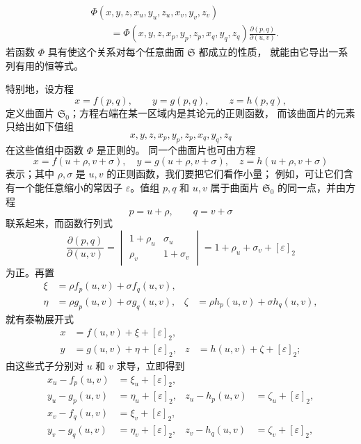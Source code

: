 \documentclass[11pt,a4paper,leqno]{article}
\begin{document}
\begin{equation}\tag{1}
\begin{aligned}
&\Phi(x,y,z,x_u,y_u,z_u,x_v,y_v,z_v)\\
&\qquad=
\Phi(x,y,z,x_p,y_p,z_p,x_q,y_q,z_q)
\frac{\partial(p,q)}{\partial(u,v)}.
\end{aligned}
\end{equation}
若函数 $\Phi$ 具有使这个关系对每个任意曲面 $\mathfrak{S}$ 都成立的性质，
就能由它导出一系列有用的恒等式。

特别地，设方程
\[
x=f(p,q),\qquad y=g(p,q),\qquad z=h(p,q),
\]
定义曲面片 $\mathfrak{S}_0$；方程右端在某一区域内是其论元的正则函数，
而该曲面片的元素只给出如下值组
\[
x,y,z,x_p,y_p,z_p,x_q,y_q,z_q
\]
在这些值组中函数 $\Phi$ 是正则的。
同一个曲面片也可由方程
\[
x=f(u+\rho,v+\sigma),\quad
y=g(u+\rho,v+\sigma),\quad
z=h(u+\rho,v+\sigma)
\]
表示；其中 $\rho,\sigma$ 是 $u,v$ 的正则函数，我们要把它们看作小量；
例如，可让它们含有一个能任意缩小的常因子 $\varepsilon$。值组
$p,q$ 和 $u,v$ 属于曲面片 $\mathfrak{S}_0$ 的同一点，并由方程
\[
p=u+\rho,\qquad q=v+\sigma
\]
联系起来，而函数行列式
\[
\frac{\partial(p,q)}{\partial(u,v)}
=
\begin{vmatrix}
1+\rho_u & \sigma_u\\
\rho_v & 1+\sigma_v
\end{vmatrix}
=1+\rho_u+\sigma_v+[\varepsilon]_2
\]
为正。再置
\[
\begin{aligned}
\xi&=\rho f_p(u,v)+\sigma f_q(u,v),\\
\eta&=\rho g_p(u,v)+\sigma g_q(u,v),
&\zeta&=\rho h_p(u,v)+\sigma h_q(u,v),
\end{aligned}
\]
就有泰勒展开式
\[
\begin{aligned}
x&=f(u,v)+\xi+[\varepsilon]_2,\\
y&=g(u,v)+\eta+[\varepsilon]_2,
&z&=h(u,v)+\zeta+[\varepsilon]_2;
\end{aligned}
\]
由这些式子分别对 $u$ 和 $v$ 求导，立即得到
\[
\begin{aligned}
x_u-f_p(u,v)&=\xi_u+[\varepsilon]_2,\\
y_u-g_p(u,v)&=\eta_u+[\varepsilon]_2,
&z_u-h_p(u,v)&=\zeta_u+[\varepsilon]_2,\\
x_v-f_q(u,v)&=\xi_v+[\varepsilon]_2,\\
y_v-g_q(u,v)&=\eta_v+[\varepsilon]_2,
&z_v-h_q(u,v)&=\zeta_v+[\varepsilon]_2,
\end{aligned}
\]
\end{document}
